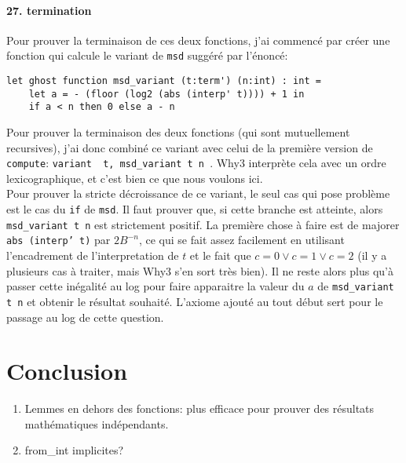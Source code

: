 \documentclass[a4paper]{article}%
\begin{document}
	\paragraph{27. termination} Pour prouver la terminaison de ces deux fonctions, j'ai commencé par créer une fonction qui calcule
	le variant de \texttt{msd} suggéré par l'énoncé:
	\begin{verbatim}
let ghost function msd_variant (t:term') (n:int) : int =
	let a = - (floor (log2 (abs (interp' t)))) + 1 in
	if a < n then 0 else a - n
	\end{verbatim}
	Pour prouver la terminaison des deux fonctions (qui sont mutuellement recursives),
	j'ai donc combiné ce variant avec celui de la première version de \texttt{compute}:
	\texttt{variant { t, msd_variant t n }}.
	Why3 interprète cela avec un ordre lexicographique, et c'est bien ce que nous voulons ici.\\

	Pour prouver la stricte décroissance de ce variant, le seul cas qui pose problème est le cas du \texttt{if}
	de \texttt{msd}. Il faut prouver que, si cette branche est atteinte, alors \texttt{msd_variant t n}
	est strictement positif. La première chose à faire est de majorer \texttt{abs (interp' t)} par $2B^{-n}$,
	ce qui se fait assez facilement en utilisant l'encadrement de l'interpretation de $t$ et le fait que $c=0 \vee c=1 \vee c=2$
	(il y a plusieurs cas à traiter, mais Why3 s'en sort très bien). Il ne reste alors plus qu'à passer cette inégalité au log
	pour faire apparaitre la valeur du $a$ de \texttt{msd_variant t n} et obtenir le résultat souhaité.
	L'axiome ajouté au tout début sert pour le passage au log de cette question.

	\section{Conclusion}
		
	\begin{enumerate}
		\item Lemmes en dehors des fonctions: plus efficace pour prouver des résultats mathématiques indépendants.
		\item from\_int implicites?
	\end{enumerate}
\end{document}
